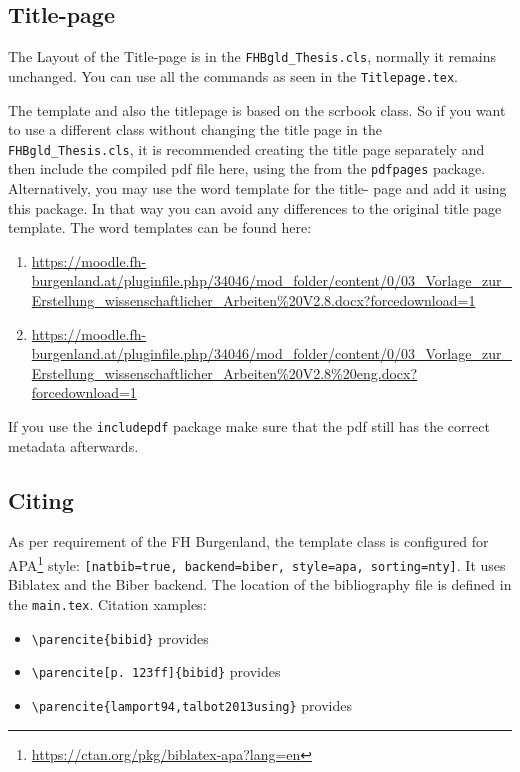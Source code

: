 \subsection{Title-page}
The Layout of the Title-page is in the \verb|FHBgld_Thesis.cls|, normally it remains unchanged. You can use all the commands as seen in the \verb|Titlepage.tex|. 

The template and also the titlepage is based on the scrbook class. So if you want to use a different class without changing the title page in the \verb|FHBgld_Thesis.cls|, it is recommended creating the title page separately and then include the compiled pdf file here, using the 
\verb|| from the \verb|pdfpages| package. Alternatively, you may use the word template for the title- page and add it using this package. In that way you can avoid any differences to the original title page template. The word templates can be found here:
\begin{enumerate}
	\item \url{https://moodle.fh-burgenland.at/pluginfile.php/34046/mod_folder/content/0/03_Vorlage_zur_Erstellung_wissenschaftlicher_Arbeiten\%20V2.8.docx?forcedownload=1}
	\item \url{https://moodle.fh-burgenland.at/pluginfile.php/34046/mod_folder/content/0/03_Vorlage_zur_Erstellung_wissenschaftlicher_Arbeiten\%20V2.8\%20eng.docx?forcedownload=1}
\end{enumerate}

If you use the \verb|includepdf| package make sure that the pdf still has the correct metadata afterwards.

\subsection{Citing}
As per requirement of the FH Burgenland, the template class is configured for APA\footnote{\url{https://ctan.org/pkg/biblatex-apa?lang=en}} style: \verb|[natbib=true, backend=biber, style=apa, sorting=nty]|. It uses Biblatex and the Biber backend. The location of the bibliography file is defined in the \verb|main.tex|. Citation xamples:
\begin{itemize}
	\item \verb|\parencite{bibid}| provides \parencite{lamport94}
	\item \verb|\parencite[p. 123ff]{bibid}| provides \parencite[p. 123ff]{lamport94}
	\item \verb|\parencite{lamport94,talbot2013using}| provides \parencite{lamport94,talbot2013using}
\end{itemize}

